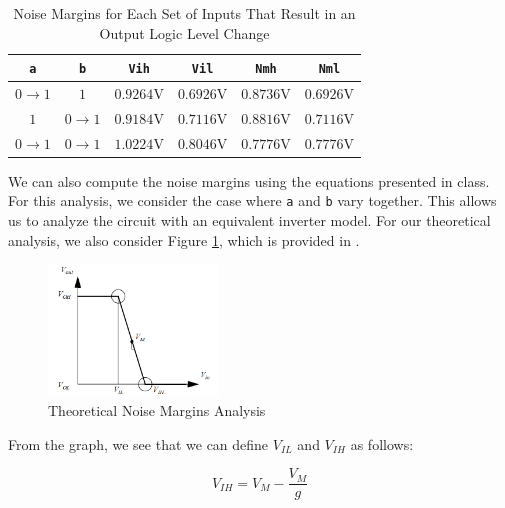 \documentclass[fleqn]{article}
\begin{document}
	\begin{table}[H]
	\begin{center}
	\caption{Noise Margins for Each Set of Inputs That Result in an Output Logic Level Change}
	\label{table::nand_gate_noise_analysis}
	\begin{tabular}{| c | c | c | c | c | c |}
		\hline
		\texttt{a} & \texttt{b} & \texttt{Vih} & \texttt{Vil} & \texttt{Nmh} & \texttt{Nml} \\
		\hline	
		$0 \rightarrow 1$ & $1$ & $0.9264 \text{V}$ & $0.6926 \text{V}$ & $0.8736 \text{V}$ & $0.6926 \text{V}$\\
		\hline	
		$1$ & $0 \rightarrow 1$ & $0.9184 \text{V}$ & $0.7116 \text{V}$ & $0.8816 \text{V}$ & $0.7116 \text{V}$\\
		\hline	
		$0 \rightarrow 1$ & $0 \rightarrow 1$ & $1.0224 \text{V}$ & $0.8046 \text{V}$ & $0.7776 \text{V}$ & $0.7776 \text{V}$\\
		\hline
	\end{tabular}
	\end{center}
	\end{table}
	
	We can also compute the noise margins using the equations presented in class. For this analysis, we consider the case where \texttt{a} and \texttt{b} vary together. This allows us to analyze the circuit with an equivalent inverter model. For our theoretical analysis, we also consider Figure \ref{fig::noise_margins_theory}, which is provided in \cite{rabaey_2003_digital}.
	
	\begin{figure}[H]
		\centerline{\includegraphics[width=0.4\textwidth]{noise_margins_theory.png}}
		\caption{Theoretical Noise Margins Analysis}
		\label{fig::noise_margins_theory}
	\end{figure}
	
	\noindent From the graph, we see that we can define $V_{IL}$ and $V_{IH}$ as follows:
	
	\begin{equation}
		\label{eq::vih_theory}
		V_{IH} = V_{M} - \frac{V_M}{g}
	\end{equation}
	
\end{document}
